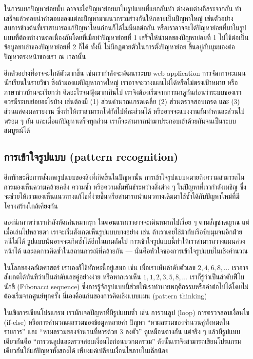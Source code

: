 ในการแยกปัญหาย่อยนั้น อาจจะได้ปัญหาย่อยมาในรูปแบบที่แยกกันทำ ต่างคนต่างอิสระจากกัน ทำเสร็จแล้วค่อยนำคำตอบของแต่ละปัญหามาผนวกรวมร่างกันให้กลายเป็นปัญหาใหญ่ เช่นตัวอย่างสมการข้างต้นที่เราสามารถแก้ปัญหาไหนก่อนก็ได้ไม่มีผลต่อกัน หรือเราอาจจะได้ปัญหาย่อยที่มาในรูปแบบที่ต้องทำงานต่อเนื่องกันโดยที่เมื่อทำปัญหาย่อยที่ 1 เสร็จให้นำผลของปัญหาย่อยที่ 1 ไปใช้ต่อเป็นข้อมูลขาเข้าของปัญหาย่อยที่ 2 ก็ได้ ทั้งนี้ ไม่มีกฏตายตัวในการตั้งปัญหาย่อย ขึ้นอยู่กับมุมมองต่อปัญหาตรงหน้าของเรา ณ เวลานั้น

อีกตัวอย่างที่อาจจะใกล้ตัวมากขึ้น เช่นเรากำลังจะพัฒนาระบบ web application การจัดการคะแนนนักเรียนในรายวิชา ซึ่งถ้ามองแต่ปัญหาภาพใหญ่ เราอาจจะวางแผนไม่ได้หรือไม่ตรงเป้าหมาย หรือภาษาชาวบ้านจะเรียกว่า คิดอะไรจนฟุ้งมากเกินไป เราจึงต้องเริ่มจากการมาดูกันก่อนว่าระบบของเราควรมีระบบย่อยอะไรบ้าง เช่นต้องมี (1) ส่วนคำนวณเกรดเฉลี่ย (2) ส่วนตรวจสอบเกรด และ (3) ส่วนแสดงผลรายงาน ซึ่งทำให้เราสามารถโฟกัสไปทีละส่วนได้ หรืออาจจะแบ่งงานกันทำคนละส่วนไปพร้อม ๆ กัน และเมื่อแก้ปัญหาเสร็จทุกส่วน เราก็จะสามารถนำมาประกอบเข้าด้วยกันจนเป็นระบบสมบูรณ์ได้

\subsection{การเข้าใจรูปแบบ (pattern recognition)}
อีกทักษะคือการสังเกตรูปแบบของสิ่งที่เกิดขึ้นในปัญหานั้น การเข้าใจรูปแบบหมายถึงความสามารถในการมองเห็นความคล้ายคลึง ความซ้ำ หรือความสัมพันธ์ระหว่างสิ่งต่าง ๆ ในปัญหาที่เรากำลังเผชิญ ซึ่งจะช่วยให้เรามองเห็นแนวทางแก้ไขที่ง่ายขึ้นหรือสามารถนำแนวทางเดิมมาใช้ซ้ำได้กับปัญหาใหม่ที่มีโครงสร้างใกล้เคียงกัน

ลองนึกภาพว่าเรากำลังหัดเล่นหมากรุก ในตอนแรกเราอาจจะเดินหมากไปเรื่อย ๆ ตามสัญชาตญาณ แต่เมื่อเล่นไปหลายตา เราจะเริ่มสังเกตเห็นรูปแบบบางอย่าง เช่น ถ้าเราเคยใช้ม้ากับเรือบีบมุมจนอีกฝ่ายหนีไม่ได้ รูปแบบนั้นอาจจะเกิดซ้ำได้อีกในเกมถัดไป การเข้าใจรูปแบบนี้ทำให้เราสามารถวางแผนล่วงหน้าได้ และลดการคิดซ้ำในสถานการณ์ที่คล้ายกัน — นั่นคือหัวใจของการเข้าใจรูปแบบในเชิงคำนวณ

ในโลกของคณิตศาสตร์ เราเองก็ใช้ทักษะนี้อยู่เสมอ เช่น เมื่อเราเห็นลำดับตัวเลข $2, 4, 6, 8, \ldots$ เราอาจสังเกตได้ทันทีว่าเป็นลำดับเลขคู่อย่างง่าย หรือหากเราเห็น $1, 1, 2, 3, 5, 8, \ldots$ เราก็รู้ว่าเป็นลำดับฟีโบนักชี (Fibonacci sequence) ซึ่งการรู้จักรูปแบบนี้ช่วยให้เราทำนายพฤติกรรมหรือค่าต่อไปได้โดยไม่ต้องเริ่มจากศูนย์ทุกครั้ง นี่เองคือแก่นของการคิดเชิงแบบแผน (pattern thinking)

ในเชิงการเขียนโปรแกรม เรามักเจอปัญหาที่มีรูปแบบซ้ำ เช่น การวนลูป (loop) การตรวจสอบเงื่อนไข (if-else) หรือการคำนวณผลรวมของข้อมูลหลายค่า ปัญหา “หาผลรวมของจำนวนคู่ทั้งหมดในรายการ” และ “หาผลรวมของจำนวนที่หารด้วย 3 ลงตัว” ดูเหมือนต่างกัน แต่จริง ๆ แล้วมีรูปแบบเดียวกันคือ “การวนลูปและตรวจสอบเงื่อนไขก่อนบวกผลรวม” ดังนั้นเราจึงสามารถเขียนโปรแกรมเดียวกันใช้แก้ปัญหาทั้งสองได้ เพียงแค่เปลี่ยนเงื่อนไขภายในเล็กน้อย


